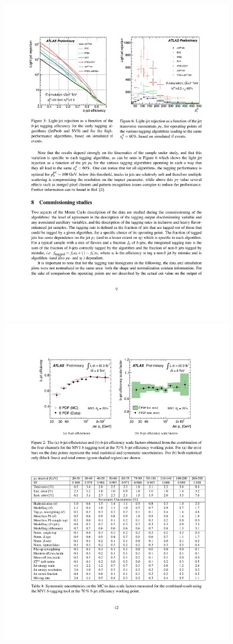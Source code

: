 \begin{figure}[tp]
  \centering
  \includegraphics[width=0.90\textwidth]{figures/performance/btag-MCperformance}
  \includegraphics[width=0.90\textwidth]{figures/performance/btag-efficiency}

\end{figure}
